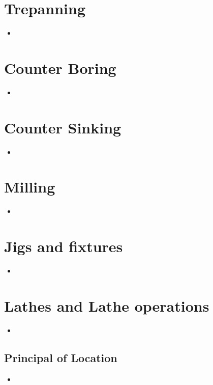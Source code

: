 \documentclass[8pt]{report}
\begin{document}
\chapter{Trepanning}
	\begin{itemize}
		\item
	\end{itemize}\hrulefill
\chapter{Counter Boring}
	\begin{itemize}
		\item
	\end{itemize}\hrulefill
\chapter{Counter Sinking}
	\begin{itemize}
		\item
	\end{itemize}\hrulefill
\chapter{Milling}
	\begin{itemize}
		\item
	\end{itemize}\hrulefill
\chapter{Jigs and fixtures}
	\begin{itemize}
		\item
	\end{itemize}\hrulefill
\chapter{Lathes and Lathe operations}
	\begin{itemize}
		\item
	\end{itemize}\hrulefill
\section{Principal of Location}
	\begin{itemize}
		\item
	\end{itemize}\hrulefill
\end{document}
